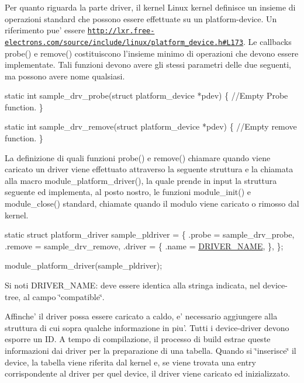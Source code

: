 Per quanto riguarda la parte driver, il kernel Linux kernel definisce un insieme di operazioni standard che possono essere effettuate su un platform-\/device. Un riferimento pue' essere \href{http://lxr.free-electrons.com/source/include/linux/platform_device.h#L173}{\tt http\+://lxr.\+free-\/electrons.\+com/source/include/linux/platform\+\_\+device.\+h\#\+L173}. Le callbacks probe() e remove() costituiscono l'insieme minimo di operazioni che devono essere implementate. Tali funzioni devono avere gli stessi parametri delle due seguenti, ma possono avere nome qualsiasi.


\begin{DoxyCode}
\textcolor{keyword}{static} \textcolor{keywordtype}{int} sample\_drv\_probe(\textcolor{keyword}{struct} platform\_device *pdev) \{
        \textcolor{comment}{//Empty Probe function.}
\}

\textcolor{keyword}{static} \textcolor{keywordtype}{int} sample\_drv\_remove(\textcolor{keyword}{struct} platform\_device *pdev) \{
        \textcolor{comment}{//Empty remove function.}
\}
\end{DoxyCode}


La definizione di quali funzioni probe() e remove() chiamare quando viene caricato un driver viene effettuato attraverso la seguente struttura e la chiamata alla macro module\+\_\+platform\+\_\+driver(), la quale prende in input la struttura seguente ed implementa, al posto nostro, le funzioni module\+\_\+init() e module\+\_\+close() standard, chiamate quando il modulo viene caricato o rimosso dal kernel.


\begin{DoxyCode}
\textcolor{keyword}{static} \textcolor{keyword}{struct }platform\_driver sample\_pldriver = \{
    .probe  = sample\_drv\_probe,
    .remove = sample\_drv\_remove,
    .driver = \{
        .name  = \hyperlink{group___kernel-_module_ga25634d21648ca7fb7a2aca614bafaaeb}{DRIVER\_NAME},
    \},
\};

module\_platform\_driver(sample\_pldriver);
\end{DoxyCode}


Si noti D\+R\+I\+V\+E\+R\+\_\+\+N\+A\+M\+E\+: deve essere identica alla stringa indicata, nel device-\/tree, al campo \char`\"{}compatible\char`\"{}.

Affinche' il driver possa essere caricato a caldo, e' necessario aggiungere alla struttura di cui sopra qualche informazione in piu'. Tutti i device-\/driver devono esporre un I\+D. A tempo di compilazione, il processo di build estrae queste informazioni dai driver per la preparazione di una tabella. Quando si \char`\"{}inserisce\char`\"{} il device, la tabella viene riferita dal kernel e, se viene trovata una entry corrispondente al driver per quel device, il driver viene caricato ed inizializzato.

